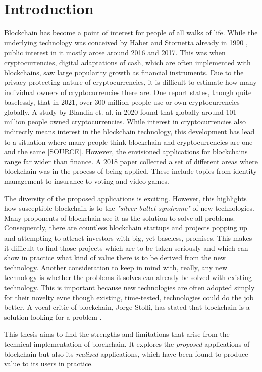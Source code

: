 \section{Introduction}

Blockchain has become a point of interest for people of all walks of
life. While the underlying technology was conceived by Haber and
Stornetta already in 1990 \cite{haber1990time}, public interest in it
mostly arose around 2016 and 2017. This was when cryptocurrencies,
digital adaptations of cash, which are often implemented with
blockchains, saw large popularity growth as financial instruments. Due
to the privacy-protecting nature of cryptocurrencies, it is difficult
to estimate how many individual owners of cryptocurrencies there are.
One report \cite{bbtcStats} states, though quite baselessly, that in
2021, over 300 million people use or own cryptocurrencies globally. A
study by Blandin et. al. in 2020 \cite{blandinBenchmark} found that
globally around 101 million people owned cryptocurrencies. While
interest in cryptocurrencies also indirectly means interest in the
blockchain technology, this development has lead to a situation where
many people think blockchain and cryptocurrencies are one and the same
[SOURCE]. However, the envisioned applications for blockchains range
far wider than finance. A 2018 paper \cite{kasparsUseCases} collected
a set of different areas where blockchain was in the process of being
applied. These include topics from identity management to insurance to
voting and video games.

The diversity of the proposed applications is exciting. However, this
highlights how susceptible blockchain is to the \textit{"silver bullet
syndrome"} of new technologies. Many proponents of blockchain see it
as the solution to solve all problems. Consequently, there are
countless blockchain startups and projects popping up and attempting
to attract investors with big, yet baseless, promises. This
makes it difficult to find those projects which are to be taken
seriously and which can show in practice what kind of value there is
to be derived from the new technology. Another consideration to keep
in mind with, really, any new technology is whether the problems it
solves can already be solved with existing technology. This is
important because new technologies are often adopted simply for their
novelty evne though existing, time-tested, technologies could do the
job better. A vocal critic of blockchain, Jorge Stolfi, has stated
that blockchain is a solution looking for a problem
\cite{stolfiNISTReview}.

This thesis aims to find the strengths and limitations that arise from
the technical implementation of blockchain. It explores the
\textit{proposed} applications of blockchain but also its
\textit{realized} applications, which have been found to produce value
to its users in practice.

